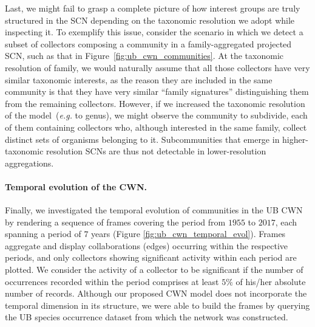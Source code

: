 Last, we might fail to grasp a complete picture of how interest groups are truly structured in the SCN depending on the taxonomic resolution we adopt while inspecting it.
To exemplify this issue, consider the scenario in which we detect a subset of collectors composing a community in a family-aggregated projected SCN, such as that in Figure~\ref{fig:ub_cwn_communities}.
At the taxonomic resolution of family, we would naturally assume that all those collectors have very similar taxonomic interests, as the reason they are included in the same community is that they have very similar ``family signatures'' distinguishing them from the remaining collectors. 
However, if we increased the taxonomic resolution of the model~(\textit{e.g.} to genus), we might observe the community to subdivide, each of them containing collectors who, although interested in the same family, collect distinct sets of organisms belonging to it.
Subcommunities that emerge in higher-taxonomic resolution SCNs are thus not detectable in lower-resolution aggregations.

\paragraph{Temporal evolution of the CWN.}
Finally, we investigated the temporal evolution of communities in the UB CWN by rendering a sequence of frames covering the period from $1955$ to $2017$, each spanning a period of $7$ years (Figure \ref{fig:ub_cwn_temporal_evol}).
Frames aggregate and display collaborations (edges) occurring within the respective periods, and only collectors showing significant activity within each period are plotted.
We consider the activity of a collector to be significant if the number of occurrences recorded within the period comprises at least $5\%$ of his/her absolute number of records.
Although our proposed CWN model does not incorporate the temporal dimension in its structure, we were able to build the frames by querying the UB species occurrence dataset from which the network was constructed.

